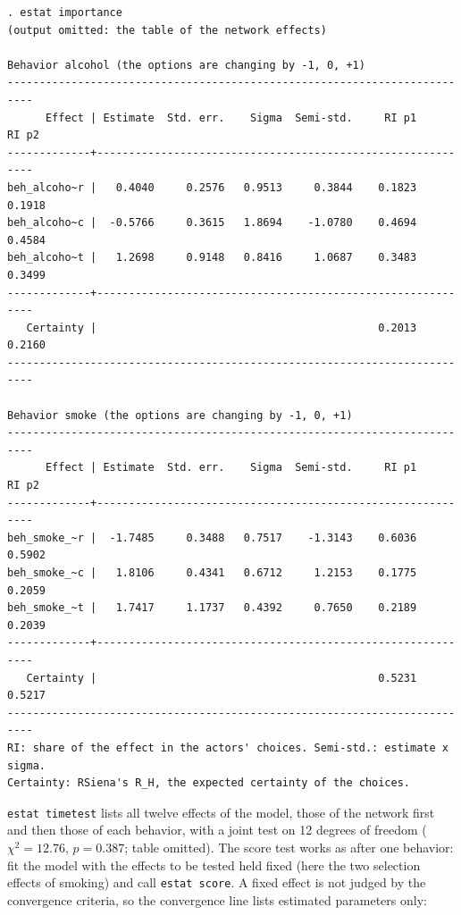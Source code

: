 \begin{lstlisting}
. estat importance
(output omitted: the table of the network effects)

Behavior alcohol (the options are changing by -1, 0, +1)
--------------------------------------------------------------------------
      Effect | Estimate  Std. err.    Sigma  Semi-std.     RI p1     RI p2
-------------+------------------------------------------------------------
beh_alcoho~r |   0.4040     0.2576   0.9513     0.3844    0.1823    0.1918
beh_alcoho~c |  -0.5766     0.3615   1.8694    -1.0780    0.4694    0.4584
beh_alcoho~t |   1.2698     0.9148   0.8416     1.0687    0.3483    0.3499
-------------+------------------------------------------------------------
   Certainty |                                            0.2013    0.2160
--------------------------------------------------------------------------

Behavior smoke (the options are changing by -1, 0, +1)
--------------------------------------------------------------------------
      Effect | Estimate  Std. err.    Sigma  Semi-std.     RI p1     RI p2
-------------+------------------------------------------------------------
beh_smoke_~r |  -1.7485     0.3488   0.7517    -1.3143    0.6036    0.5902
beh_smoke_~c |   1.8106     0.4341   0.6712     1.2153    0.1775    0.2059
beh_smoke_~t |   1.7417     1.1737   0.4392     0.7650    0.2189    0.2039
-------------+------------------------------------------------------------
   Certainty |                                            0.5231    0.5217
--------------------------------------------------------------------------
RI: share of the effect in the actors' choices. Semi-std.: estimate x sigma.
Certainty: RSiena's R_H, the expected certainty of the choices.
\end{lstlisting}
\texttt{estat timetest} lists all twelve effects of the model, those of the network first and then those of each behavior, with a joint test on 12 degrees of freedom ($\chi^2=12.76$, $p=0.387$; table omitted). The score test works as after one behavior: fit the model with the effects to be tested held fixed (here the two selection effects of smoking) and call \texttt{estat score}. A fixed effect is not judged by the convergence criteria, so the convergence line lists estimated parameters only:
